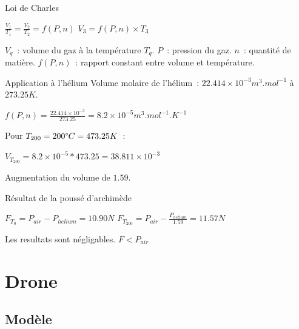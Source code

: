 \documentclass{beamer}
\begin{document}
\begin{frame}{Loi de Charles}
  \begin{center}
    $\displaystyle{\frac{V_1}{T_1} = \frac{V_2}{T_2} = f(P, n)}$
    $\displaystyle{V_3 = f(P, n) \times T_3}$
  \end{center}
  $V_q$~: volume du gaz à la température $T_q$. $P$~: pression du gaz. $n$~: quantité de matière. $f(P, n)$~: rapport constant entre volume et température.
\end{frame}

\begin{frame}{Application à l'hélium}
  Volume molaire de l'hélium~: $22.414\times 10^{-3} m^3.mol^{-1}$ à $273.25K$.
  \begin{center}
    $\displaystyle{f(P, n) = \frac{22.414\times 10^{-3}}{273.25} = 8.2\times 10^{-5} m^3.mol^{-1}.K^{-1}}$
  \end{center}
  Pour $T_{200} = 200 \degree C = 473.25 K$~:
  \begin{center}
    $\displaystyle{V_{T_{200}} = 8.2\times 10^{-5} * 473.25 = 38.811 \times 10^{-3}}$
  \end{center}
  Augmentation du volume de $1.59$.
\end{frame}

\begin{frame}{Résultat de la poussé d'archimède}
  \begin{center}
    $\displaystyle{F_{T_0} = P_{air} - P_{helium} = 10.90 N}$
    \bigbreak
    $\displaystyle{F_{T_{200}} = P_{air} - \frac{P_{helium}}{1.59} = 11.57 N}$ \\
  \end{center}
  Les resultats sont négligables. $F < P_{air}$
\end{frame}

\section{Drone}

\subsection{Modèle}
\end{document}

